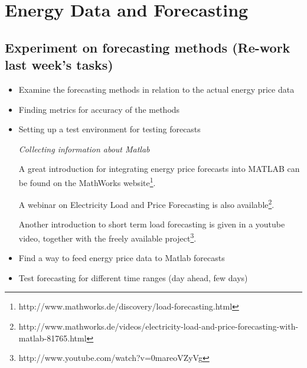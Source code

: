\documentclass[a4paper]{article}
\begin{document}
\vspace{1em}

\hfill\date{Week 17, from 21.04. to 27.04.}

\section{Energy Data and Forecasting}

\subsection{Experiment on forecasting methods (Re-work last week's tasks)}

\begin{itemize}

\item Examine the forecasting methods in relation to the actual energy price data

\item Finding metrics for accuracy of the methods

\item Setting up a test environment for testing forecasts

\subitem \emph{Collecting information about Matlab}

A great introduction for integrating energy price forecasts into MATLAB can be found on the MathWorks website\footnote{http://www.mathworks.de/discovery/load-forecasting.html}. 

A webinar on Electricity Load and Price Forecasting is also available\footnote{http://www.mathworks.de/videos/electricity-load-and-price-forecasting-with-matlab-81765.html}.

Another introduction to short term load forecasting is given in a youtube video, together with the freely available project\footnote{http://www.youtube.com/watch?v=0mareoVZyVg}.


\item Find a way to feed energy price data to Matlab forecasts

\item Test forecasting for different time ranges (day ahead, few days)

\end{itemize}
\end{document}

